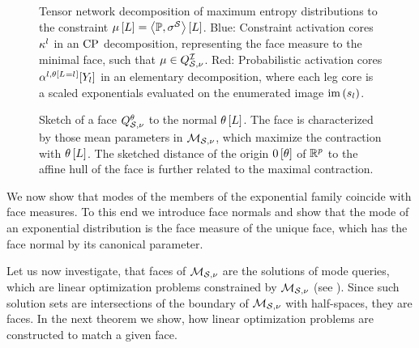 \begin{figure}
    \begin{center}
        
    \end{center}
    \caption{
        Tensor network decomposition of maximum entropy distributions to the constraint $\mu\left[L\right]=\left\langle \mathbb{P},\sigma^{\mathcal{S}}\right\rangle \left[ L \right]$.
        Blue: Constraint activation cores $\kappa^{l}$ in an $\mathrm{CP}$ decomposition, representing the face measure to the minimal face, such that $\mu\in Q^{\mathcal{I}}_{\mathcal{S},\nu}$.
        Red: Probabilistic activation cores $\alpha^{l,\theta\left[L_{}=l_{}\right]}[Y_{l}]$ in an elementary decomposition, where each leg core is a scaled exponentials evaluated on the enumerated image $\mathrm{im}\left(s_{l}\right)$.
    }\label{fig:maxEntropyActcore}
\end{figure}




\begin{figure}[t!]
    \begin{center}
        
    \end{center}
    \caption{Sketch of a face $Q^{\theta}_{\mathcal{S},\nu}$ to the normal $\theta\left[L\right]$.
    The face is characterized by those mean parameters in $\mathcal{M}_{\mathcal{S},\nu}$, which maximize the contraction with $\theta\left[L\right]$.
    The sketched distance of the origin $0\left[\theta\right]$ of $\mathbb{R}^{p}$ to the affine hull of the face is further related to the maximal contraction.
    }\label{fig:meansetSketchFace}
\end{figure}

We now show that modes of the members of the exponential family coincide with face measures.
To this end we introduce face normals and show that the mode of an exponential distribution is the face measure of the unique face, which has the face normal by its canonical parameter.


Let us now investigate, that faces of $\mathcal{M}_{\mathcal{S},\nu}$ are the solutions of mode queries, which are linear optimization problems constrained by $\mathcal{M}_{\mathcal{S},\nu}$ (see ).
Since such solution sets are intersections of the boundary of $\mathcal{M}_{\mathcal{S},\nu}$ with half-spaces, they are faces.
In the next theorem we show, how linear optimization problems are constructed to match a given face.

